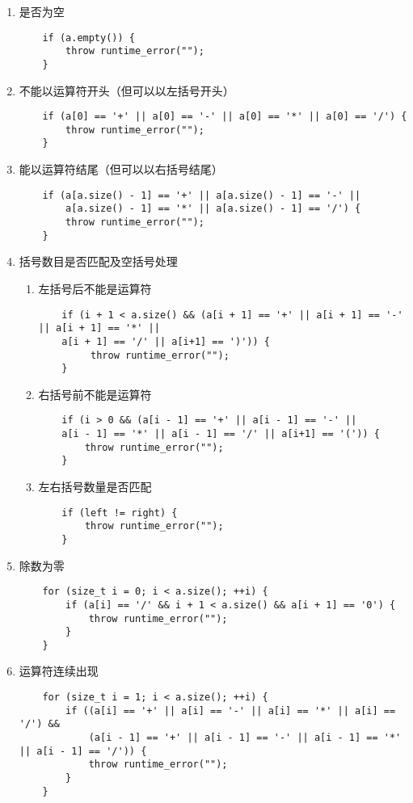 \documentclass[a4paper]{article}
\begin{document}
\begin{enumerate}
    \item 是否为空
    \begin{lstlisting}
    if (a.empty()) {
        throw runtime_error("");
    }
    \end{lstlisting}
    \item 不能以运算符开头（但可以以左括号开头）
    \begin{lstlisting}
    if (a[0] == '+' || a[0] == '-' || a[0] == '*' || a[0] == '/') {
        throw runtime_error("");
    }
    \end{lstlisting}
    \item 能以运算符结尾（但可以以右括号结尾）
    \begin{lstlisting}
    if (a[a.size() - 1] == '+' || a[a.size() - 1] == '-' || 
        a[a.size() - 1] == '*' || a[a.size() - 1] == '/') {
        throw runtime_error("");
    }

    \end{lstlisting}
    \item 括号数目是否匹配及空括号处理
    \begin{enumerate}
        \item 左括号后不能是运算符
        \begin{lstlisting}
    if (i + 1 < a.size() && (a[i + 1] == '+' || a[i + 1] == '-' || a[i + 1] == '*' || 
    a[i + 1] == '/' || a[i+1] == ')')) {
         throw runtime_error("");
    }
        \end{lstlisting}
        \item 右括号前不能是运算符
        \begin{lstlisting}
    if (i > 0 && (a[i - 1] == '+' || a[i - 1] == '-' || 
    a[i - 1] == '*' || a[i - 1] == '/' || a[i+1] == '(')) {
        throw runtime_error("");
    }
        \end{lstlisting}
        \item 左右括号数量是否匹配
        \begin{lstlisting}
    if (left != right) {
        throw runtime_error("");
    }
        \end{lstlisting}    
    \end{enumerate}
    \item 除数为零
    \begin{lstlisting}
    for (size_t i = 0; i < a.size(); ++i) {
        if (a[i] == '/' && i + 1 < a.size() && a[i + 1] == '0') {
            throw runtime_error("");
        }
    }
    \end{lstlisting}
    \item 运算符连续出现
    \begin{lstlisting}
    for (size_t i = 1; i < a.size(); ++i) {
        if ((a[i] == '+' || a[i] == '-' || a[i] == '*' || a[i] == '/') && 
            (a[i - 1] == '+' || a[i - 1] == '-' || a[i - 1] == '*' || a[i - 1] == '/')) {
            throw runtime_error("");
        }
    }
    \end{lstlisting} 
\end{enumerate} 
\end{document}
